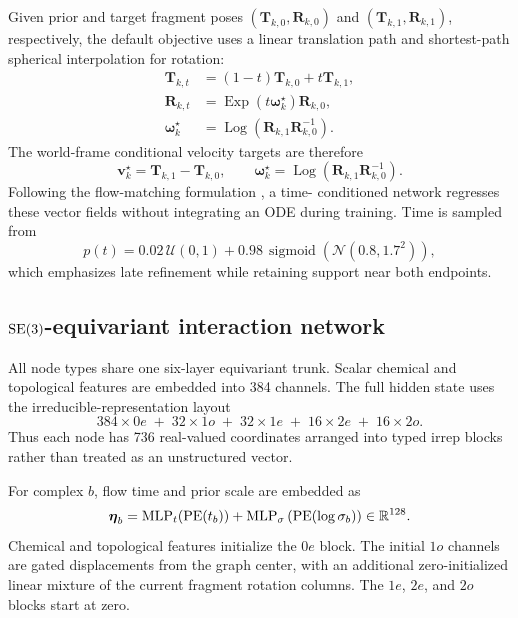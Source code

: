 Given prior and target fragment poses
\((\mathbf{T}_{k,0},\mathbf{R}_{k,0})\) and
\((\mathbf{T}_{k,1},\mathbf{R}_{k,1})\), respectively, the default objective
uses a linear translation path and shortest-path spherical interpolation for
rotation:
\begin{align}
    \mathbf{T}_{k,t}
    &=
    (1-t)\mathbf{T}_{k,0}
    +t\mathbf{T}_{k,1},
    \label{eq:translation_path}\\
    \mathbf{R}_{k,t}
    &=
    \operatorname{Exp}(t\boldsymbol{\omega}^{\star}_k)
    \mathbf{R}_{k,0},
    \label{eq:rotation_path}\\
    \boldsymbol{\omega}^{\star}_k
    &=
    \operatorname{Log}
    \left(\mathbf{R}_{k,1}\mathbf{R}_{k,0}^{-1}\right).
\end{align}
The world-frame conditional velocity targets are therefore
\begin{equation}
    \mathbf{v}^{\star}_k
    =
    \mathbf{T}_{k,1}-\mathbf{T}_{k,0},
    \qquad
    \boldsymbol{\omega}^{\star}_k
    =
    \operatorname{Log}
    \left(\mathbf{R}_{k,1}\mathbf{R}_{k,0}^{-1}\right).
    \label{eq:flow_targets}
\end{equation}
Following the flow-matching formulation \citep{lipman2023flow}, a time-
conditioned network regresses these vector fields without integrating an ODE
during training. Time is sampled from
\[
  p(t)=0.02\,\mathcal{U}(0,1)
  +0.98\,\operatorname{sigmoid}
  \left(\mathcal{N}(0.8,1.7^2)\right),
\]
which emphasizes late refinement while retaining support near both endpoints.

\subsection{\texorpdfstring{\(\mathrm{SE}(3)\)}{SE(3)}-equivariant interaction network}
\label{sec:equivariant_network}

All node types share one six-layer equivariant trunk. Scalar chemical and
topological features are embedded into 384 channels. The full hidden state
uses the irreducible-representation layout
\[
    384\times 0e
    \;+\;
    32\times 1o
    \;+\;
    32\times 1e
    \;+\;
    16\times 2e
    \;+\;
    16\times 2o.
\]
Thus each node has 736 real-valued coordinates arranged into typed irrep
blocks rather than treated as an unstructured vector.

For complex \(b\), flow time and prior scale are embedded as
\begin{equation}
    \boldsymbol{\eta}_b
    =
    \operatorname{MLP}_{t}(\operatorname{PE}(t_b))
    +
    \operatorname{MLP}_{\sigma}
    \left(\operatorname{PE}(\log\sigma_b)\right)
    \in\mathbb{R}^{128}.
    \label{eq:time_sigma_embedding}
\end{equation}
Chemical and topological features initialize the \(0e\) block. The initial
\(1o\) channels are gated displacements from the graph center, with an
additional zero-initialized linear mixture of the current fragment rotation
columns. The \(1e\), \(2e\), and \(2o\) blocks start at zero.

